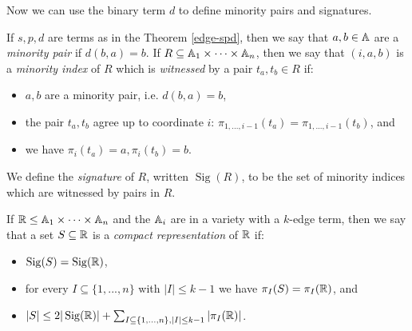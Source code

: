 \documentclass[letterpaper,11pt]{article}
\DeclareMathOperator{\Sig}{Sig}
\begin{document}
Now we can use the binary term $d$ to define minority pairs and signatures.

\begin{defn} If $s,p,d$ are terms as in the Theorem \ref{edge-spd}, then we say that $a,b \in \mathbb{A}$ are a \emph{minority pair} if $d(b,a) = b$. If $R \subseteq \mathbb{A}_1 \times \cdots \times \mathbb{A}_n$, then we say that $(i,a,b)$ is a \emph{minority index} of $R$ which is \emph{witnessed} by a pair $t_a, t_b \in R$ if:
\begin{itemize}
\item $a,b$ are a minority pair, i.e. $d(b,a) = b$,

\item the pair $t_a, t_b$ agree up to coordinate $i$: $\pi_{1, ..., i-1}(t_a) = \pi_{1, ..., i-1}(t_b)$, and

\item we have $\pi_i(t_a) = a, \pi_i(t_b) = b$.
\end{itemize}
We define the \emph{signature} of $R$, written $\Sig(R)$, to be the set of minority indices which are witnessed by pairs in $R$.
\end{defn}

\begin{defn} If $\mathbb{R} \le \mathbb{A}_1 \times \cdots \times \mathbb{A}_n$ and the $\mathbb{A}_i$ are in a variety with a $k$-edge term, then we say that a set $S \subseteq \mathbb{R}$ is a \emph{compact representation} of $\mathbb{R}$ if:
\begin{itemize}
\item $\Sig(S) = \Sig(\RR)$,

\item for every $I \subseteq \{1, ..., n\}$ with $|I| \le k-1$ we have $\pi_I(S) = \pi_I(\mathbb{R})$, and

\item $|S| \le 2|\Sig(\RR)| + \sum_{I \subseteq \{1,...,n\}, |I| \le k-1} |\pi_I(\RR)|$.
\end{itemize}
\end{defn}
\end{document}
